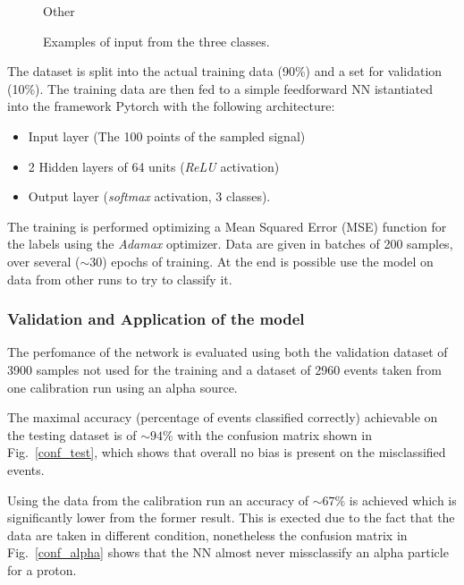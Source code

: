 \begin{figure}[htb]
\begin{minipage}[b]{0.45\textwidth}
  \caption{Other}
  \end{minipage}
  \caption{Examples of input from the three classes.}
  \label{input}
\end{figure}

The dataset is split into the actual training data (\num{90}\%) and a set for validation (\num{10}\%). The training data are then fed to a simple feedforward NN istantiated into the framework Pytorch with the following architecture:

\begin{itemize}
	\item Input layer (The \num{100} points of the sampled signal)
	\item 2 Hidden layers of 64 units (\emph{ReLU} activation)
	\item Output layer (\emph{softmax} activation, 3 classes).
\end{itemize}

The training is performed optimizing a Mean Squared Error (MSE) function for the labels using the \emph{Adamax} optimizer. Data are given in batches of 200 samples, over several ($\sim 30$) epochs of training. At the end is possible use the model on data from other runs to try to classify it.

\subsubsection{Validation and Application of the model}

The perfomance of the network is evaluated using both the validation dataset of \num{3900} samples not used for the training and a dataset of 2960 events taken from one calibration run using an alpha source.


The maximal accuracy (percentage of events classified correctly) achievable on the testing dataset is of $\sim\num{94} \%$ with the confusion matrix shown in Fig.~\ref{conf_test}, which shows that overall no bias is present on the misclassified events.


Using the data from the calibration run an accuracy of $\sim\num{67} \%$ is achieved which is significantly lower from the former result. This is exected due to the fact that the data are taken in different condition, nonetheless the confusion matrix in Fig.~\ref{conf_alpha} shows that the NN almost never missclassify an alpha particle for a proton.

